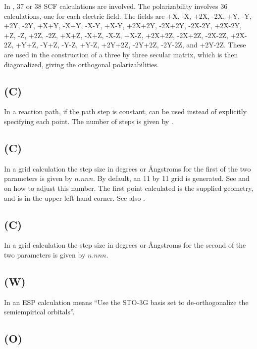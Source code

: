 In , 37 or 38 SCF calculations are involved.  The polarizability
involves 36 calculations, one for each electric field.  The fields are +X, -X,
+2X, -2X, +Y, -Y, +2Y, -2Y, +X+Y, -X+Y, -X-Y, +X-Y, +2X+2Y, -2X+2Y, -2X-2Y,
+2X-2Y, +Z, -Z, +2Z, -2Z, +X+Z, -X+Z, -X-Z, +X-Z, +2X+2Z, -2X+2Z, -2X-2Z,
+2X-2Z, +Y+Z, -Y+Z, -Y-Z, +Y-Z, +2Y+2Z, -2Y+2Z, -2Y-2Z, and +2Y-2Z.
These are used in the construction of a three by three secular matrix, which
is then diagonalized, giving the orthogonal polarizabilities.

\subsection*{ (C)}
        In a reaction path, if the path step is constant,  can  be  used
   instead  of  explicitly  specifying  each  point.  The number of steps is
   given by .


\subsection*{ (C)}
\label{step}
In a grid calculation the step size in degrees or \AA ngstroms for  the
first  of  the two parameters is given by $n.nnn$.  By default, an 11 by 11
grid is generated.  See  and  on how to adjust  this  number.
The  first point calculated is the supplied geometry, and is in the upper
left hand corner.  See also .

\subsection*{ (C)}
In a grid calculation the step size in degrees or \AA ngstroms for  the
second of the two parameters is given by $n.nnn$.

\subsection*{ (W)}
        In an ESP calculation  means ``Use  the  STO-3G  basis  set  to
   de-orthogonalize the semiempirical orbitals''.

\subsection*{ (O)}

